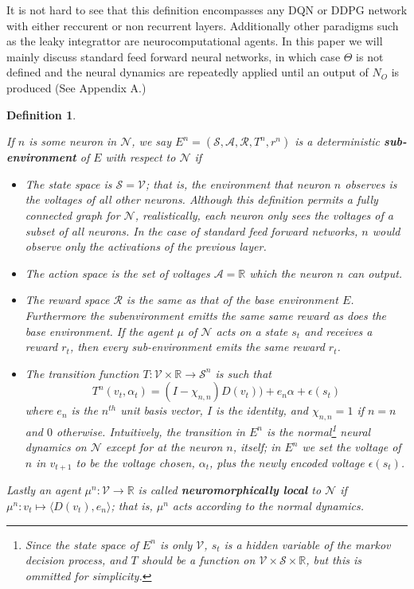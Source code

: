 \documentclass{article} %
\newtheorem{definition}[theorem]{Definition}
\numberwithin{equation}{subsection}
\numberwithin{theorem}{subsection}
\def\reals{{\mathbb R}}
\theoremstyle{named}
\def\scriptv{{\mathcal V}}
\def\scripta{{\mathcal A}}
\def\scriptr{{\mathcal R}}
\def\scriptn{{\mathcal N}}
\def\scripts{{\mathcal S}}
\begin{document}
It is not hard to see that this definition encompasses any DQN or DDPG network with either reccurent or non recurrent layers. Additionally other paradigms such as the leaky integrattor are neurocomputational agents. In this paper we will mainly discuss standard feed forward neural networks, in which case $\Theta$ is not defined and the neural dynamics are repeatedly applied until an output of $N_O$ is produced (See Appendix A.)


\begin{definition}\label{def:subenv}

 If $n$ is some neuron in $\scriptn$, we say $E^n = (\scripts, \scripta, \scriptr, T^n, r^n)$ is a deterministic \textbf{sub-environment} of $E$ with respect to $\scriptn$ if

\begin{itemize}
  \item The state space is $\scripts = \scriptv$;  that is, the environment that neuron $n$ observes is the voltages of all other neurons. Although this definition permits a fully connected graph for $\scriptn$, realistically, each neuron only sees the voltages of a subset of all neurons. In the case of standard feed forward networks, $n$ would observe only the activations of the previous layer.

  \item The action space is the set of voltages $\scripta = \reals$ which the neuron $n$ can output.
  \item The reward space $\scriptr$ is the same as that of the base environment $E$. Furthermore the subenvironment emitts the same same reward as does the base environment. If the agent $\mu$ of $\scriptn$ acts on a state $s_t$ and receives a reward $r_t$, then every sub-environment emits the same reward $r_t$. 
  \item The transition function $T : \scriptv \times \mathbb{R}  \to \scripts ^n$ is such that 
  \begin{equation}
    T^n(v_t, \alpha_t) = (I - \chi_{n,n}) D(v_t)) + e_n \alpha + \epsilon(s_t)
  \end{equation}
  where $e_n$ is the $n^{th}$ unit basis vector, $I$ is the identity, and $\chi_{n,n} =1$ if $n = n$ and $0$ otherwise. Intuitively, the transition in $E^n$ is the normal\footnote{Since the state space of $E^n$ is only
  $\scriptv$, $s_t$ is a hidden variable of the markov decision process, and $T$ should be a function on $\scriptv \times \scripts \times \mathbb{R}$, but this is ommitted for simplicity.} neural dynamics on $\scriptn$ except for at the neuron $n$, itself; in $E^n$ we set the voltage of $n$ in $v_{t+1}$ to be the voltage chosen, $\alpha_t$, plus the newly encoded voltage $\epsilon(s_t)$.
\end{itemize}
 Lastly an agent  $\mu^n: \scriptv \to \mathbb{R}$  is called \textbf{neuromorphically local} to $\scriptn$ if $\mu^n: v_t \mapsto \langle D(v_t), e_n \rangle$; that is, $\mu^n$ acts according to the normal dynamics.

\end{definition}
\end{document}
